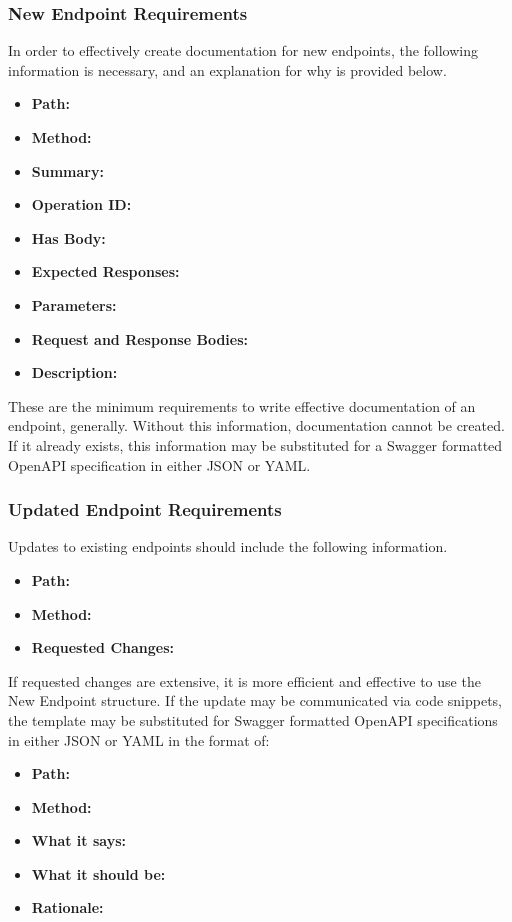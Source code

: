 \documentclass[a4paper]{article}
\begin{document}
\subsubsection*{New Endpoint Requirements}
In order to effectively create documentation for new endpoints, the following information is necessary, and an explanation for why is provided below.
\begin{itemize}
	\item \textbf{Path:} 
	\item \textbf{Method:} 
	\item \textbf{Summary:} 
	\item \textbf{Operation ID:} 
	\item \textbf{Has Body:} 
	\item \textbf{Expected Responses:} 
	\item \textbf{Parameters:} 
	\item \textbf{Request and Response Bodies:}
	\item \textbf{Description:} 
\end{itemize}

These are the minimum requirements to write effective documentation of an endpoint, generally. Without this information, documentation cannot be created. If it already exists, this information may be substituted for a Swagger formatted OpenAPI specification in either {\ttfamily JSON} or {\ttfamily YAML}.

\subsubsection*{Updated Endpoint Requirements}
Updates to existing endpoints should include the following information.
\begin{itemize}
	\item \textbf{Path:} 
	\item \textbf{Method:} 
	\item \textbf{Requested Changes:} 
\end{itemize}
If requested changes are extensive, it is more efficient and effective to use the New Endpoint structure. If the update may be communicated via code snippets, the template may be substituted for Swagger formatted OpenAPI specifications in either {\ttfamily JSON} or {\ttfamily YAML} in the format of:
\begin{itemize}
	\item \textbf{Path:} 
	\item \textbf{Method:} 
	\item \textbf{What it says:} 
	\item \textbf{What it should be:} 
	\item \textbf{Rationale:} 
\end{itemize}
\end{document}
